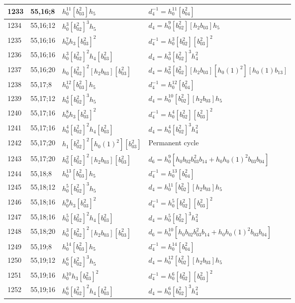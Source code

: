 \documentclass{article}
\begin{document}
\begin{longtable}{|l|l|>{\raggedright\arraybackslash}p{6cm}|>{\raggedright\arraybackslash}p{6cm}|}
\hline
1233 & 55,16;8 & $h_0^{11}[b_{03}^2]h_5$ & $d_{4}^{-1}=h_0^{11}[b_{04}^2]$\\
\hline
1234 & 55,16;12 & $h_0^3[b_{02}^2]^3h_5$ &$d_{4}=h_0^9[b_{02}^2][h_2b_{03}]h_5$\\
\hline
1235 & 55,16;16 & $h_0^7h_3[b_{03}^2]^2$ & $d_{4}^{-1}=h_0^3[b_{02}^2][b_{03}^2]^2$\\
1236 & 55,16;16 & $h_0^3[b_{02}^2]^2h_4[b_{03}^2]$ &$d_{4}=h_0^3[b_{02}^2]^3h_4^2$\\
\hline
1237 & 55,16;20 & $h_0[b_{02}^2]^2[h_2b_{03}][b_{03}^2]$ &$d_{4}=h_0^2[b_{02}^2][h_2b_{03}][h_0(1)^2][h_0(1)b_{13}]$\\
\hline
1238 & 55,17;8 & $h_0^{12}[b_{03}^2]h_5$ & $d_{4}^{-1}=h_0^{12}[b_{04}^2]$\\
\hline
1239 & 55,17;12 & $h_0^4[b_{02}^2]^3h_5$ &$d_{4}=h_0^{10}[b_{02}^2][h_2b_{03}]h_5$\\
\hline
1240 & 55,17;16 & $h_0^8h_3[b_{03}^2]^2$ & $d_{4}^{-1}=h_0^4[b_{02}^2][b_{03}^2]^2$\\
1241 & 55,17;16 & $h_0^4[b_{02}^2]^2h_4[b_{03}^2]$ &$d_{4}=h_0^4[b_{02}^2]^3h_4^2$\\
\hline
1242 & 55,17;20 & $h_1[b_{02}^2]^2[h_0(1)^2][b_{03}^2]$ & Permanent cycle\\
1243 & 55,17;20 & $h_0^2[b_{02}^2]^2[h_2b_{03}][b_{03}^2]$ &$d_{6}=h_0^9[h_0b_{02}b_{03}^2b_{14} + h_0h_0(1)^2b_{03}b_{04}]$\\
\hline
1244 & 55,18;8 & $h_0^{13}[b_{03}^2]h_5$ & $d_{4}^{-1}=h_0^{13}[b_{04}^2]$\\
\hline
1245 & 55,18;12 & $h_0^5[b_{02}^2]^3h_5$ &$d_{4}=h_0^{11}[b_{02}^2][h_2b_{03}]h_5$\\
\hline
1246 & 55,18;16 & $h_0^9h_3[b_{03}^2]^2$ & $d_{4}^{-1}=h_0^5[b_{02}^2][b_{03}^2]^2$\\
1247 & 55,18;16 & $h_0^5[b_{02}^2]^2h_4[b_{03}^2]$ &$d_{4}=h_0^5[b_{02}^2]^3h_4^2$\\
\hline
1248 & 55,18;20 & $h_0^3[b_{02}^2]^2[h_2b_{03}][b_{03}^2]$ &$d_{6}=h_0^{10}[h_0b_{02}b_{03}^2b_{14} + h_0h_0(1)^2b_{03}b_{04}]$\\
\hline
1249 & 55,19;8 & $h_0^{14}[b_{03}^2]h_5$ & $d_{4}^{-1}=h_0^{14}[b_{04}^2]$\\
\hline
1250 & 55,19;12 & $h_0^6[b_{02}^2]^3h_5$ &$d_{4}=h_0^{12}[b_{02}^2][h_2b_{03}]h_5$\\
\hline
1251 & 55,19;16 & $h_0^{10}h_3[b_{03}^2]^2$ & $d_{4}^{-1}=h_0^6[b_{02}^2][b_{03}^2]^2$\\
1252 & 55,19;16 & $h_0^6[b_{02}^2]^2h_4[b_{03}^2]$ &$d_{4}=h_0^6[b_{02}^2]^3h_4^2$\\

\end{longtable}
\end{document}
